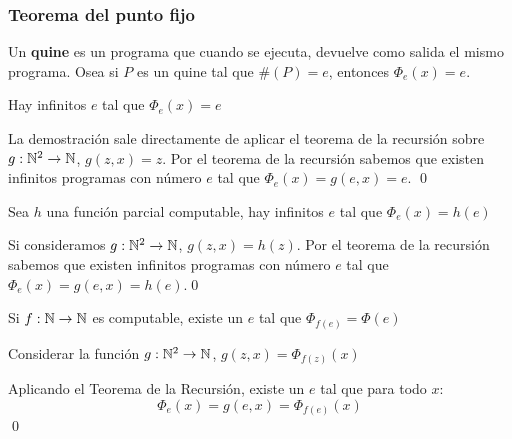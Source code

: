 \subsubsection{Teorema del punto fijo}
Un \textbf{quine} es un programa que cuando se ejecuta, devuelve como salida el mismo programa. Osea si $P$ es un quine tal que $\#(P) = e$, entonces $\Phi_e(x) = e$.

\begin{proposicion}
	Hay infinitos $e$ tal que $\Phi_e(x) = e$
\end{proposicion}

\begin{demo}
	La demostración sale directamente de aplicar el teorema de la recursión sobre $g:\mathbb{N}^2\to\mathbb{N}$, $g(z,x) = z$. Por el teorema de la recursión sabemos que existen infinitos programas con número $e$ tal que $\Phi_e(x) = g(e,x) = e$. \qed
\end{demo}

\begin{proposicion}
	Sea $h$ una función parcial computable, hay infinitos $e$ tal que $\Phi_e(x) = h(e)$
\end{proposicion}
\begin{demo}
	Si consideramos $g:\mathbb{N}^2\to\mathbb{N}$, $g(z,x) = h(z)$. Por el teorema de la recursión sabemos que existen infinitos programas con número $e$ tal que $\Phi_e(x) = g(e,x) = h(e)$.\qed
\end{demo}

\begin{teorema}\label{teorema::ePhiFe}
	Si $f:\mathbb{N}\to\mathbb{N}$ es computable, existe un $e$ tal que $\Phi_{f(e)} = \Phi(e)$
\end{teorema}

\begin{demo}
	Considerar la función $g:\mathbb{N}^2\to\mathbb{N}$, $g(z,x) = \Phi_{f(z)}(x)$
	
	Aplicando el Teorema de la Recursión, existe un $e$ tal que para todo $x$:
	$$\Phi_e(x) = g(e,x) = \Phi_{f(e)}(x)$$ \qed
\end{demo}